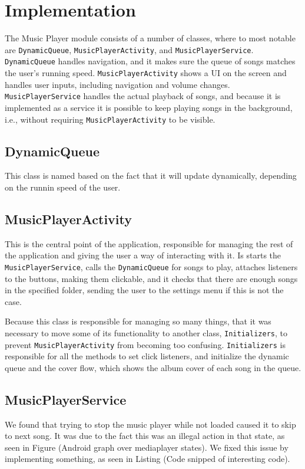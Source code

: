 \section{Implementation}
The Music Player module consists of a number of classes, where to most notable are \texttt{DynamicQueue}, \texttt{MusicPlayerActivity}, and \texttt{MusicPlayerService}. \texttt{DynamicQueue} handles navigation, and it makes sure the queue of songs matches the user's running speed. \texttt{MusicPlayerActivity} shows a UI on the screen and handles user inputs, including navigation and volume changes. \texttt{MusicPlayerService} handles the actual playback of songs, and because it is implemented as a service it is possible to keep playing songs in the background, i.e., without requiring \texttt{MusicPlayerActivity} to be visible.

\subsection{DynamicQueue}
\label{sec:dynamicQueue}
This class is named based on the fact that it will update dynamically, depending on the runnin speed of the user.

\subsection{MusicPlayerActivity}
This is the central point of the application, responsible for managing the rest of the application and giving the user a way of interacting with it. Is starts the \texttt{MusicPlayerService}, calls the \texttt{DynamicQueue} for songs to play, attaches listeners to the buttons, making them clickable, and it checks that there are enough songs in the specified folder, sending the user to the settings menu if this is not the case.

Because this class is responsible for managing so many things, that it was necessary to move some of its functionality to another class, \texttt{Initializers}, to prevent \texttt{MusicPlayerActivity} from becoming too confusing. \texttt{Initializers} is responsible for all the methods to set click listeners, and initialize the dynamic queue and the cover flow, which shows the album cover of each song in the queue.

\subsection{MusicPlayerService} 

 We found that trying to stop the music player while not loaded caused it to skip to next song. It was due to the fact this was an illegal action in that state, as seen in Figure (Android graph over mediaplayer states). We fixed this issue by implementing something, as seen in Listing (Code snipped of interesting code).